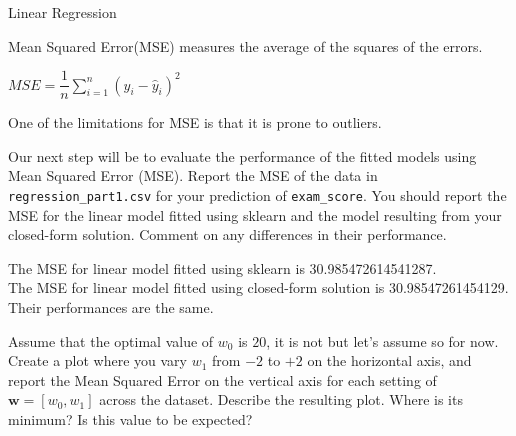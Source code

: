\documentclass[12pt]{article}
\begin{document}
\begin{question}{Linear Regression}
\begin{subquestion}
\begin{answerbox}{10em}
Mean Squared Error(MSE) measures the average of the squares of the errors.

    $MSE = \dfrac{1}{n}\sum_{i=1}^{n}(y_{i}-\hat{y}_{i})^{2}$
    
One of the limitations for MSE is that it is prone to outliers.
\end{answerbox}



\end{subquestion}


 
%
%
\begin{subquestion}{Our next step will be to evaluate the performance of the fitted models using Mean Squared Error (MSE). 
Report the MSE of the data in \texttt{regression\_part1.csv} for your prediction of \texttt{exam\_score}.
You should report the MSE for the linear model fitted using sklearn and the model resulting from your closed-form solution. 
Comment on any differences in their performance. 
}


\begin{answerbox}{10em}
The MSE for linear model fitted using sklearn is 30.985472614541287.\\
The MSE for linear model fitted using closed-form solution is 30.98547261454129.\\
Their performances are the same.
\end{answerbox}

 

\end{subquestion}






\begin{subquestion}{Assume that the optimal value of $w_0$ is $20$, it is not but let's assume so for now. 
Create a plot where you vary $w_1$ from $-2$ to $+2$ on the horizontal axis, and report the Mean Squared Error on the vertical axis for each setting of $\mathbf{w} = [w_0, w_1]$ across the dataset. 
Describe the resulting plot. Where is its minimum? Is this value to be expected?\\ 
}



\end{subquestion}
\end{question}
\end{document}
